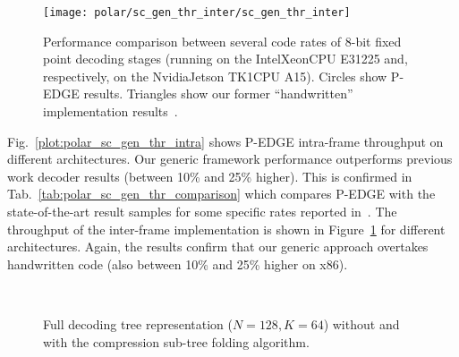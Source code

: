 \begin{figure}
  \texttt{[image: polar/sc\_gen\_thr\_inter/sc\_gen\_thr\_inter]}
  \caption{Performance comparison between several code rates of 8-bit fixed
    point decoding stages (running on the Intel\R Xeon\TM CPU E31225 and,
    respectively, on the Nvidia\R Jetson TK1\TM CPU A15). Circles show P-EDGE
    results. Triangles show our former ``handwritten'' implementation
    results~\cite{LeGal2015a}.}
  \label{plot:polar_sc_gen_thr_inter}
\end{figure}

Fig.~\ref{plot:polar_sc_gen_thr_intra} shows P-EDGE intra-frame throughput on
different architectures. Our generic framework performance outperforms previous
work decoder results (between 10\% and 25\% higher). This is confirmed in
Tab.~\ref{tab:polar_sc_gen_thr_comparison} which compares P-EDGE with the
state-of-the-art result samples for some specific rates reported
in~\cite{Sarkis2014}. The throughput of the inter-frame implementation is shown
in Figure~\ref{plot:polar_sc_gen_thr_inter} for different architectures. Again,
the results confirm that our generic approach overtakes handwritten code (also
between 10\% and 25\% higher on x86).

\begin{figure}
  \centering
  \\
  \caption{Full decoding tree representation ($N = 128, K = 64$) without and
    with the compression sub-tree folding algorithm.}
  \label{fig:polar_sc_gen_compression}
\end{figure}

